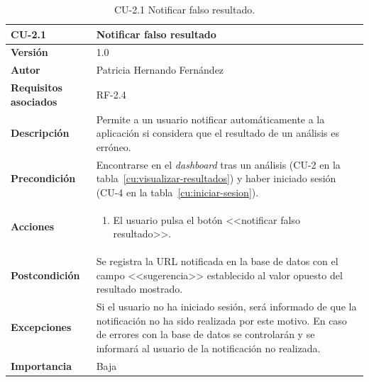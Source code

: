 \begin{table}[p]
	\centering
	\begin{tabularx}{\linewidth}{ p{} p{} }
		\toprule
		\textbf{CU-2.1}    & \textbf{Notificar falso resultado}\\
		\toprule
		\textbf{Versión}              & 1.0    \\
		\textbf{Autor}                & Patricia Hernando Fernández \\
		\textbf{Requisitos asociados} & RF-2.4 \\
		\textbf{Descripción}          & Permite a un usuario notificar automáticamente a la aplicación si considera que el resultado de un análisis es erróneo.\\
		\textbf{Precondición}         & Encontrarse en el \textit{dashboard} tras un análisis (CU-2 en la tabla~\ref{cu:visualizar-resultados}) y haber iniciado sesión (CU-4 en la tabla~\ref{cu:iniciar-sesion}).\\
		\textbf{Acciones}             &
		\begin{enumerate}
			\def\labelenumi{\arabic{enumi}.}
			\tightlist
			\item El usuario pulsa el botón <<notificar falso resultado>>.
		\end{enumerate}\\
		\textbf{Postcondición}        & Se registra la URL notificada en la base de datos con el campo <<sugerencia>> establecido al valor opuesto del resultado mostrado. \\
		\textbf{Excepciones}          & Si el usuario no ha iniciado sesión, será informado de que la notificación no ha sido realizada por este motivo. En caso de errores con la base de datos se controlarán y se informará al usuario de la notificación no realizada.\\
		\textbf{Importancia}          & Baja \\
		\bottomrule
	\end{tabularx}
	\caption{CU-2.1  Notificar falso resultado.}
	\label{cu:notificar-falso-resultado}
\end{table}



